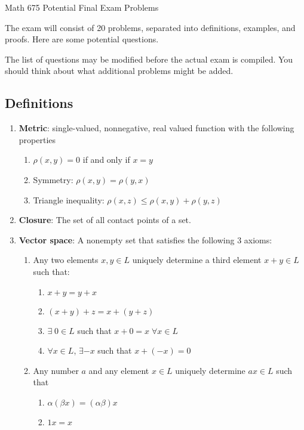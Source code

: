 \documentclass[12pt,letterpaper,reqno]{amsart}
\begin{document}
\thispagestyle{empty}
\centerline{\Large Math 675 Potential Final Exam Problems}
\vspace{.25in}

The exam will consist of 20 problems, separated into definitions, examples, and proofs. Here are some potential questions. 

The list of questions may be modified before the actual exam is compiled.  You should think about what additional problems might be added.

\subsection*{Definitions}
\begin{enumerate}[1.]
\item \textbf{Metric}: single-valued, nonnegative, real valued function with the following properties
\begin{enumerate}
\item $\rho(x,y) = 0$ if and only if $x = y$
\item Symmetry: $\rho(x,y) = \rho(y,x)$
\item Triangle inequality: $\rho(x,z) \leq \rho(x,y) + \rho(y,z)$
\end{enumerate}
\item \textbf{Closure}: The set of all contact points of a set.
\item \textbf{Vector space}: A nonempty set that satisfies the following 3 axioms:
    \begin{enumerate}
        \item Any two elements $x,y \in L$ uniquely determine a third element $x+y \in L$ such that:
        \begin{enumerate}
            \item $x+y = y+x$
            \item $(x+y)+z = x+(y+z)$
            \item $\exists \; 0 \in L$ such that $x+0=x \; \forall x \in L$
            \item $\forall x \in L$, $\exists -x$ such that $x + (-x) = 0$
        \end{enumerate}
        \item Any number $a$ and any element $x \in L$ uniquely determine $ax \in L$ such that
        \begin{enumerate}
            \item $\alpha(\beta x) = (\alpha\beta)x$
            \item $1 x = x$
        \end{enumerate}

\end{enumerate}
\end{enumerate}
\end{document}
